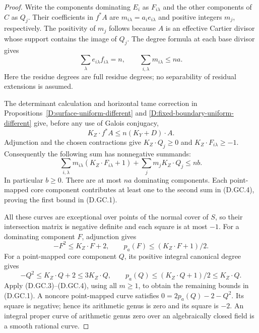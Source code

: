\begin{proof}
Write the components dominating $E_i$ as $F_{i\lambda}$ and
the other components of $C$ as $Q_j$.  Their coefficients in
$f^*A$ are $m_{i\lambda}=a_i e_{i\lambda}$ and positive
integers $m_j$, respectively.  The positivity of $m_j$ follows
because $A$ is an effective Cartier divisor whose support
contains the image of $Q_j$.  The degree formula at each base
divisor gives
\[
 \sum_\lambda e_{i\lambda}f_{i\lambda}=n,
 \qquad
 \sum_{i,\lambda}m_{i\lambda}\le na.                    \tag{D.GC.3}
\]
Here the residue degrees are full residue degrees; no
separability of residual extensions is assumed.

The determinant calculation and horizontal tame correction in
Propositions~\ref{D:surface-uniform-different} and
\ref{D:fixed-boundary-uniform-different} give, before any use
of Galois conjugacy,
\[
                 K_Z\cdot f^*A\le n(K_Y+D)\cdot A.
\]
Adjunction and the chosen contractions give
$K_Z\cdot Q_j\ge0$ and $K_Z\cdot F_{i\lambda}\ge-1$.
Consequently the following sum has nonnegative summands:
\[
 \sum_{i,\lambda}m_{i\lambda}
                 (K_Z\cdot F_{i\lambda}+1)
       +\sum_jm_jK_Z\cdot Q_j\le nb.                  \tag{D.GC.4}
\]
In particular $b\ge0$.  There are at most $na$ dominating
components.  Each point-mapped core component contributes at
least one to the second sum in (D.GC.4), proving the first
bound in (D.GC.1).

All these curves are exceptional over points of the normal
cover of $S$, so their intersection matrix is negative
definite and each square is at most $-1$.  For a dominating
component $F$, adjunction gives
\[
 -F^2\le K_Z\cdot F+2,
 \qquad p_a(F)\le (K_Z\cdot F+1)/2.
\]
For a point-mapped core component $Q$, its positive integral
canonical degree gives
\[
 -Q^2\le K_Z\cdot Q+2\le3K_Z\cdot Q,
 \qquad p_a(Q)\le(K_Z\cdot Q+1)/2\le K_Z\cdot Q.
\]
Apply (D.GC.3)--(D.GC.4), using all $m\ge1$, to obtain the
remaining bounds in (D.GC.1).  A noncore point-mapped curve
satisfies
$0=2p_a(Q)-2-Q^2$.  Its square is negative; hence its arithmetic
genus is zero and its square is $-2$.  An integral proper
curve of arithmetic genus zero over an algebraically closed
field is a smooth rational curve.


\end{proof}
